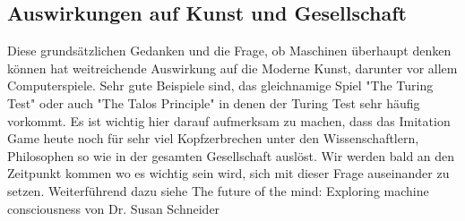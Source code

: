 \subsection{Auswirkungen auf Kunst und Gesellschaft}
Diese grundsätzlichen Gedanken und die Frage, ob Maschinen überhaupt denken können hat weitreichende Auswirkung auf die Moderne Kunst, darunter vor allem Computerspiele. Sehr gute Beispiele sind, das gleichnamige Spiel "The Turing Test" oder auch "The Talos Principle" in denen der Turing Test sehr häufig vorkommt. Es ist wichtig hier darauf aufmerksam zu machen, dass das Imitation Game heute noch für sehr viel Kopfzerbrechen unter den Wissenschaftlern, Philosophen so
wie in der gesamten Gesellschaft auslöst. Wir werden bald an den Zeitpunkt kommen wo es wichtig sein wird, sich mit dieser Frage auseinander zu setzen. Weiterführend dazu siehe The future of the mind: Exploring machine consciousness von Dr. Susan Schneider\cite{explorecons}

